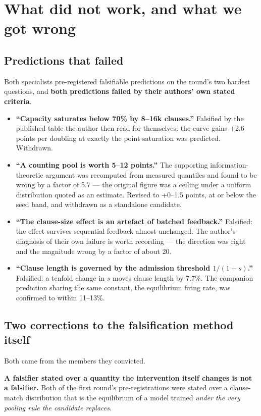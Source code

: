 \section{What did not work, and what we got wrong}

\subsection{Predictions that failed}
Both specialists pre-registered falsifiable predictions on the round's two hardest questions, and
\textbf{both predictions failed by their authors' own stated criteria}.

\begin{itemize}
\item \textbf{``Capacity saturates below 70\% by 8--16k clauses.''} Falsified by the published table
      the author then read for themselves: the curve gains +2.6 points per doubling at exactly the
      point saturation was predicted. Withdrawn.
\item \textbf{``A counting pool is worth 5--12 points.''} The supporting information-theoretic
      argument was recomputed from measured quantiles and found to be wrong by a factor of 5.7 --- the
      original figure was a ceiling under a uniform distribution quoted as an estimate. Revised to
      +0--1.5 points, at or below the seed band, and withdrawn as a standalone candidate.
\item \textbf{``The clause-size effect is an artefact of batched feedback.''} Falsified: the effect
      survives sequential feedback almost unchanged. The author's diagnosis of their own failure is
      worth recording --- the direction was right and the magnitude wrong by a factor of about 20.
\item \textbf{``Clause length is governed by the admission threshold $1/(1+s)$.''} Falsified: a
      tenfold change in $s$ moves clause length by 7.7\%. The companion prediction sharing the same
      constant, the equilibrium firing rate, was confirmed to within 11--13\%.
\end{itemize}

\subsection{Two corrections to the falsification method itself}
Both came from the members they convicted.

\textbf{A falsifier stated over a quantity the intervention itself changes is not a falsifier.} Both
of the first round's pre-registrations were stated over a clause-match distribution that is the
equilibrium of a model trained \emph{under the very pooling rule the candidate replaces}.


